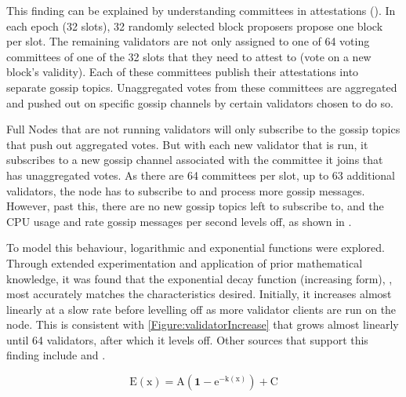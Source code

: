 This finding can be explained by understanding committees in attestations (). In each epoch (32 slots), 32 randomly selected block proposers propose one block per slot. The remaining validators are not only assigned to one of 64 voting committees of one of the 32 slots that they need to attest to (vote on a new block's validity). Each of these committees publish their attestations into separate gossip topics. Unaggregated votes from these committees are aggregated and pushed out on specific gossip channels by certain validators chosen to do so. 

Full Nodes that are not running validators will only subscribe to the gossip topics that push out aggregated votes. But with each new validator that is run, it subscribes to a new gossip channel associated with the committee it joins that has unaggregated votes. As there are 64 committees per slot, up to 63 additional validators, the node has to subscribe to and process more gossip messages. However, past this, there are no new gossip topics left to subscribe to, and the CPU usage and rate gossip messages per second levels off, as shown in .

To model this behaviour, logarithmic and exponential functions were explored. Through extended experimentation and application of prior mathematical knowledge, it was found that the exponential decay function (increasing form), , most accurately matches the characteristics desired. Initially, it increases almost linearly at a slow rate before levelling off as more validator clients are run on the node. This is consistent with \ref{Figure:validatorIncrease} that grows almost linearly until 64 validators, after which it levels off. Other sources that support this finding include \cite{Roy2022StakingExchange} and \cite{2021HardwareEthstaker}.

\begin{equation}
    \label{eqn: ExpDecayGeneral}
    \boldsymbol{\mathrm{E(\mathrm{x})} = \mathrm{A} (1-\mathrm{e}^{-\mathrm{k}(\mathrm{x})}) + \mathrm{C}}
\end{equation}

